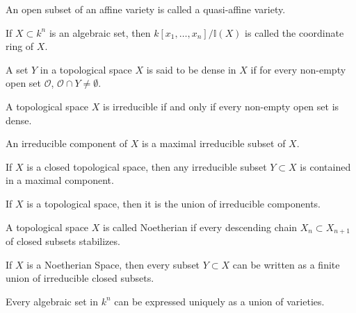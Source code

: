 \documentclass[crop=false,class=article,oneside]{standalone}
\begin{document}
            \begin{definition}
                An open subset of an affine variety
                is called a quasi-affine variety.
            \end{definition}
            \begin{definition}
                If $X\subset k^n$ is an algebraic set,
                then $k[x_1,\hdots ,x_n]/\mathbb{I}(X)$
                is called the coordinate ring of $X$.
            \end{definition}
            \begin{definition}
                A set $Y$ in a topological space $X$ is
                said to be dense in $X$ if for every
                non-empty open set $\mathcal{O}$,
                $\mathcal{O}\cap Y\ne \emptyset$.
            \end{definition}
            \begin{theorem}
                A topological space $X$ is irreducible if
                and only if every non-empty open set is dense.
            \end{theorem}
            \begin{definition}
                An irreducible component of $X$ is a
                maximal irreducible subset of $X$.
            \end{definition}
            \begin{theorem}
                If $X$ is a closed topological space,
                then any irreducible subset $Y\subset X$ is
                contained in a maximal component.
            \end{theorem}
            \begin{theorem}
                If $X$ is a topological space,
                then it is the union of irreducible components.
            \end{theorem}
            \begin{definition}
                A topological space $X$ is called Noetherian
                if every descending chain $X_n \subset X_{n+1}$
                of closed subsets stabilizes.
            \end{definition}
            \begin{theorem}
                If $X$ is a Noetherian Space,
                then every subset $Y\subset X$ can be
                written as a finite union of irreducible
                closed subsets.
            \end{theorem}
            \begin{theorem}
                Every algebraic set in $k^n$ can be expressed
                uniquely as a union of varieties.
            \end{theorem}
\end{document}
